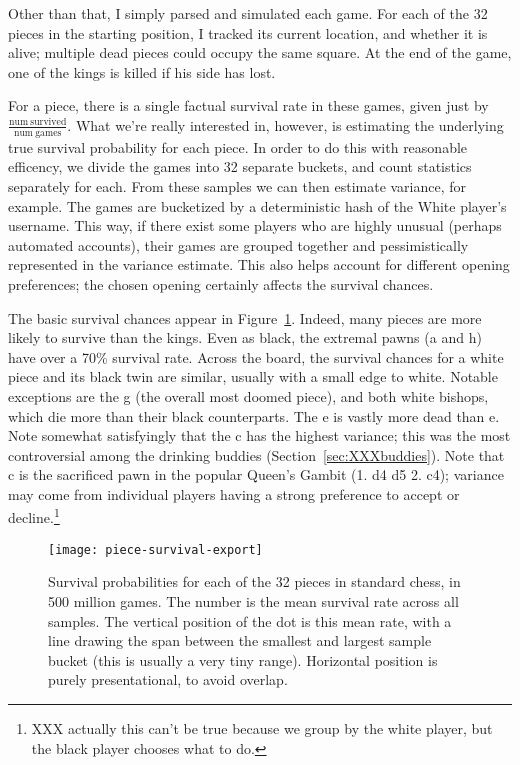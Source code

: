 \documentclass[twocolumn]{article}
\newcommand{\Pawn}[1][1.3ex]{%
\adjustbox{Trim=4.3pt 2.6pt 4.3pt 0pt,width=#1,margin=0.2ex 0ex 0.2ex 0ex}{\BlackPawnOnWhite}%
}%
\begin{document}
Other than that, I simply parsed and simulated each game. For each
of the 32 pieces in the starting position, I tracked its current
location, and whether it is alive; multiple dead pieces could
occupy the same square. At the end of the game, one of the kings is
killed if his side has lost.

For a piece, there is a single factual survival rate in these games,
given just by $\frac{\mathrm{num~survived}}{\mathrm{num~games}}$. What
we're really interested in, however, is estimating the underlying true
survival probability for each piece. In order to do this with
reasonable efficency, we divide the games into 32 separate buckets,
and count statistics separately for each. From these samples we can
then estimate variance, for example. The games are bucketized by a
deterministic hash of the White player's username. This way, if there
exist some players who are highly unusual (perhaps automated
accounts), their games are grouped together and pessimistically
represented in the variance estimate. This also helps account for
different opening preferences; the chosen opening certainly affects
the survival chances.

The basic survival chances appear in Figure~\ref{fig:piece-survival}.
Indeed, many pieces are more likely to survive than the kings. Even as
black, the extremal pawns (\pawn a and \pawn h) have over a 70\%
survival rate. Across the board, the survival chances for a white
piece and its black twin are similar, usually with a small edge to
white. Notable exceptions are the \knight g (the overall most doomed
piece), and both white bishops, which die more than their black
counterparts. The \pawn e is vastly more dead than \Pawn e. Note
somewhat satisfyingly that the \pawn c has the highest variance; this
was the most controversial among the drinking buddies
(Section~\ref{sec:XXXbuddies}). Note that \pawn c is the sacrificed pawn
  in the popular Queen's Gambit (1. d4 d5 2. c4); variance may come
  from individual players having a strong preference to accept or
  decline.\footnote{XXX actually this can't be true because we group
    by the white player, but the black player chooses what to do.}


\begin{figure}[htb]
  \begin{center}
    \texttt{[image: piece-survival-export]}
  \end{center}\vspace{-0.1in}
  \caption{Survival probabilities for each of the 32 pieces in standard
    chess, in 500 million games. The number is the mean survival rate
    across all samples. The vertical position of the dot is this mean
    rate, with a line drawing the span between the smallest and largest
    sample bucket (this is usually a very tiny range).
    Horizontal position is purely presentational, to avoid overlap.}
  \label{fig:piece-survival}
\end{figure}



\nocite{chesstego}

{}

\end{document}
